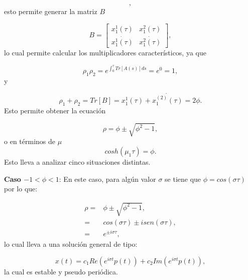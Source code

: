 \documentclass[10pt,a4paper]{report}
\begin{document}
\begin{equation}
[\begin{array}{c}
x_1^2(t) \\
\dot{x_1^2(t)}
\end{array}],
\end{equation} esto permite generar la matriz $B$

\begin{equation}
B= [\begin{array}{cc}

x_1^1(\tau) & x_1^2(\tau) \\
\dot{x_1^1(\tau)} & \dot{x_1^2(\tau)}

\end{array}],
\end{equation} lo cual permite calcular los multiplicadores característicos, ya que

\begin{equation}
\rho_1 \rho_2 = e^{\int_0^\tau Tr[A(s)]ds} = e^0 = 1,
\end{equation} y

\begin{equation}
\rho_1 + \rho_2 = Tr[B] =x_1^1(\tau)+ \dot{x_1^{(2)}(\tau)} = 2\phi.
\end{equation} Esto permite obtener la ecuación

\begin{equation}
\rho = \phi \pm \sqrt{\phi^2 -1},
\end{equation} o en términos de $\mu$
\begin{equation}
cosh(\mu_1 \tau) = \phi.
\end{equation} Esto lleva a analizar cinco situaciones distintas.

\textbf{Caso $ -1 < \phi < 1$}: En este caso, para algún valor $\sigma$ se tiene que $\phi = cos(\sigma \tau)$ por lo que:

\begin{align*}
\rho =& \phi \pm \sqrt{\phi^2 -1},\\
=& cos(\sigma \tau) \pm isen(\sigma \tau), \\
=& e^{\pm i\sigma \tau},
\end{align*} lo cual lleva a una solución general de tipo:

\begin{equation}
x(t) = c_1 Re(e^{i\sigma t} p(t)) + c_2 Im(e^{i\sigma t} p(t)),
\end{equation} la cual es estable y pseudo periódica.
\end{document}
